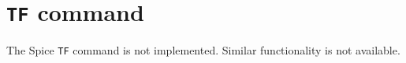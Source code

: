 \section{{\tt TF} command}
The Spice {\tt TF} command is not implemented.  Similar functionality is
not available.
